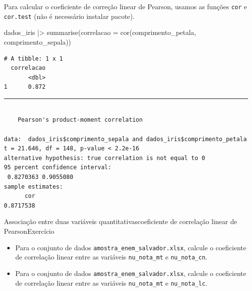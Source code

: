 \documentclass[
  10pt,
  ignorenonframetext,
]{beamer}
\newenvironment{Shaded}{\begin{snugshade}}{\end{snugshade}}
\newcommand{\AttributeTok}[1]{\textcolor[rgb]{0.40,0.45,0.13}{#1}}
\newcommand{\FunctionTok}[1]{\textcolor[rgb]{0.28,0.35,0.67}{#1}}
\newcommand{\NormalTok}[1]{\textcolor[rgb]{0.00,0.23,0.31}{#1}}
\newcommand{\SpecialCharTok}[1]{\textcolor[rgb]{0.37,0.37,0.37}{#1}}
\providecommand{\tightlist}{%
  \setlength{\itemsep}{0pt}\setlength{\parskip}{0pt}}\usepackage{longtable,booktabs,array}
\newcommand*{\regrafina}{\rule{\textwidth}{0.5pt}}
\begin{document}
\begin{frame}[fragile]
\footnotesize

Para calcular o coeficiente de correção linear de Pearson, usamos as
funções \texttt{cor} e \texttt{cor.test} (não é necessário instalar
pacote).

\begin{Shaded}
\begin{Highlighting}[]
\NormalTok{dados\_iris }\SpecialCharTok{|\textgreater{}} 
  \FunctionTok{summarise}\NormalTok{(}\AttributeTok{correlacao =} \FunctionTok{cor}\NormalTok{(comprimento\_petala, comprimento\_sepala))}
\end{Highlighting}
\end{Shaded}

\begin{verbatim}
# A tibble: 1 x 1
  correlacao
       <dbl>
1      0.872
\end{verbatim}

\regrafina

\begin{Shaded}
\end{Shaded}

\begin{verbatim}

    Pearson's product-moment correlation

data:  dados_iris$comprimento_sepala and dados_iris$comprimento_petala
t = 21.646, df = 148, p-value < 2.2e-16
alternative hypothesis: true correlation is not equal to 0
95 percent confidence interval:
 0.8270363 0.9055080
sample estimates:
      cor 
0.8717538 
\end{verbatim}

\normalsize
\end{frame}

\begin{frame}[fragile]{Associação entre duas variáveis
quantitativas\newline coeficiente de correlação linear de
Pearson\newline Exercício}
\protect\hypertarget{associauxe7uxe3o-entre-duas-variuxe1veis-quantitativascoeficiente-de-correlauxe7uxe3o-linear-de-pearsonexercuxedcio}{}
\begin{itemize}
\tightlist
\item
  Para o conjunto de dados \texttt{amostra\_enem\_salvador.xlsx},
  calcule o coeficiente de correlação linear entre as variáveis
  \texttt{nu\_nota\_mt} e \texttt{nu\_nota\_cn}.
\item
  Para o conjunto de dados \texttt{amostra\_enem\_salvador.xlsx},
  calcule o coeficiente de correlação linear entre as variáveis
  \texttt{nu\_nota\_mt} e \texttt{nu\_nota\_lc}.
\end{itemize}
\end{frame}
\end{document}
